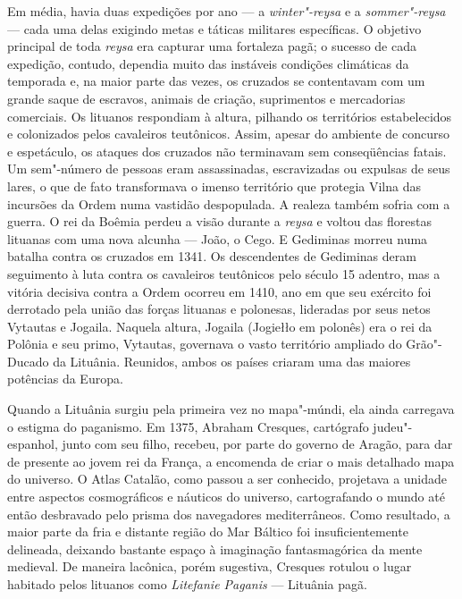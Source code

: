Em média, havia duas expedições por ano --- a \emph{winter"-reysa} e a
\emph{sommer"-reysa} --- cada uma delas exigindo metas e táticas militares
específicas. O objetivo principal de toda \emph{reysa} era capturar uma
fortaleza pagã; o sucesso de cada expedição, contudo, dependia muito das
instáveis condições climáticas da temporada e, na maior parte das vezes,
os cruzados se contentavam com um grande saque de escravos, animais de
criação, suprimentos e mercadorias comerciais. Os lituanos respondiam à
altura, pilhando os territórios estabelecidos e colonizados pelos
cavaleiros teutônicos. Assim, apesar do ambiente de concurso e
espetáculo, os ataques dos cruzados não terminavam sem conseqüências
fatais. Um sem"-número de pessoas eram assassinadas, escravizadas ou
expulsas de seus lares, o que de fato transformava o imenso território
que protegia Vilna das incursões da Ordem numa vastidão despopulada. A
realeza também sofria com a guerra. O rei da Boêmia perdeu a visão
durante a \emph{reysa} e voltou das florestas lituanas com uma nova
alcunha --- João, o Cego. E Gediminas morreu numa batalha contra os
cruzados em 1341. Os descendentes de Gediminas deram seguimento à luta
contra os cavaleiros teutônicos pelo século 15 adentro, mas a vitória
decisiva contra a Ordem ocorreu em 1410, ano em que seu exército foi
derrotado pela união das forças lituanas e polonesas, lideradas por seus
netos Vytautas e Jogaila. Naquela altura, Jogaila (Jogiełło em polonês)
era o rei da Polônia e seu primo, Vytautas, governava o vasto território
ampliado do Grão"-Ducado da Lituânia. Reunidos, ambos os países criaram
uma das maiores potências da Europa.

Quando a Lituânia surgiu pela primeira vez no mapa"-múndi, ela ainda
carregava o estigma do paganismo. Em 1375, Abraham Cresques, cartógrafo
judeu"-espanhol, junto com seu filho, recebeu, por parte do governo de
Aragão, para dar de presente ao jovem rei da França, a encomenda de
criar o mais detalhado mapa do universo. O Atlas Catalão, como passou a
ser conhecido, projetava a unidade entre aspectos cosmográficos e
náuticos do universo, cartografando o mundo até então desbravado pelo
prisma dos navegadores mediterrâneos. Como resultado, a maior parte da
fria e distante região do Mar Báltico foi insuficientemente delineada,
deixando bastante espaço à imaginação fantasmagórica da mente medieval.
De maneira lacônica, porém sugestiva, Cresques rotulou o lugar habitado
pelos lituanos como \emph{Litefanie Paganis} --- Lituânia pagã.

